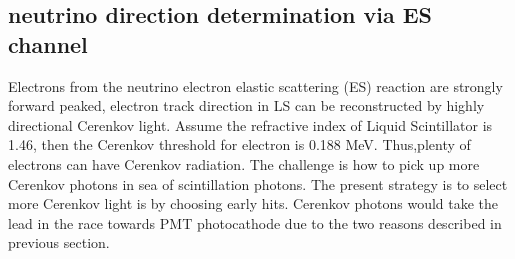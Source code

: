 \documentclass[a4paper,10pt]{cpc-hepnp}
\begin{document}
\subsection{neutrino direction determination via ES channel}
Electrons from the neutrino electron elastic scattering (ES) reaction are
strongly forward peaked, electron track direction in LS can be reconstructed
by highly directional Cerenkov light. Assume the refractive index of Liquid 
Scintillator is 1.46, then the Cerenkov threshold for electron is 0.188 MeV.
Thus,plenty of electrons can have Cerenkov radiation. The challenge is how 
to pick up more Cerenkov photons in sea of scintillation photons. 
The present strategy is to select more Cerenkov light is by choosing early hits. 
Cerenkov photons would take the lead in the race towards PMT photocathode due
to the two reasons described in previous section. 
\end{document}
